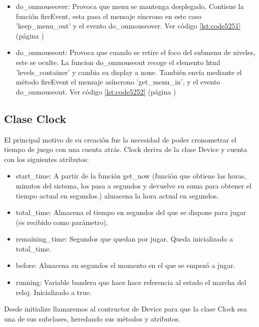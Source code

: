 \begin{itemize}
 \item do\_onmouseover: Provoca que menu se mantenga desplegado. Contiene la función fireEvent, esta pasa el 
 mensaje síncrono en este caso 'keep\_menu\_out' y el evento do\_onmouseover. Ver código \ref{lst:code5251} (página \pageref{lst:code5251})

 \item do\_onmouseout: Provoca que cuando se retire el foco del submenu de niveles, este se oculte.
La funcion do\_onmouseout recoge el elemento html 'levels\_container' y cambia su display a none.
También envía mediante el método fireEvent el mensaje asíncrono 'get\_menu\_in', y el evento do\_onmouseout. 
Ver código \ref{lst:code5252} (página \pageref{lst:code5252})
\end{itemize}


\subsection{Clase Clock}
\label{subsection:clock}

El principal motivo de su creación fue la necesidad de poder cronometrar el tiempo de juego con una cuenta atrás.
Clock deriva de la clase Device y cuenta con los siguientes atributos:

\begin{itemize}
 \item start\_time: A partir de la función get\_now (función que obtiene las horas, minutos del sistema, los pasa a segundos y devuelve su suma para 
obtener el tiempo actual en segundos.) almacena la hora actual en segundos.

 \item total\_time: Almacena el tiempo en segundos del que se dispone para jugar (es recibido como parámetro).
 
 \item remaining\_time: Segundos que quedan por jugar. Queda inicializado a total\_time.
 
 \item before: Almacena en segundos el momento en el que se empezó a jugar.
 
 \item running: Variable bandera que hace hace referencia al estado el marcha del reloj. Inicializado a true.
\end{itemize}

Desde initialize llamaremos al contructor de Device para que la clase Clock sea una de sus subclases, heredando sus métodos y atributos.\\

